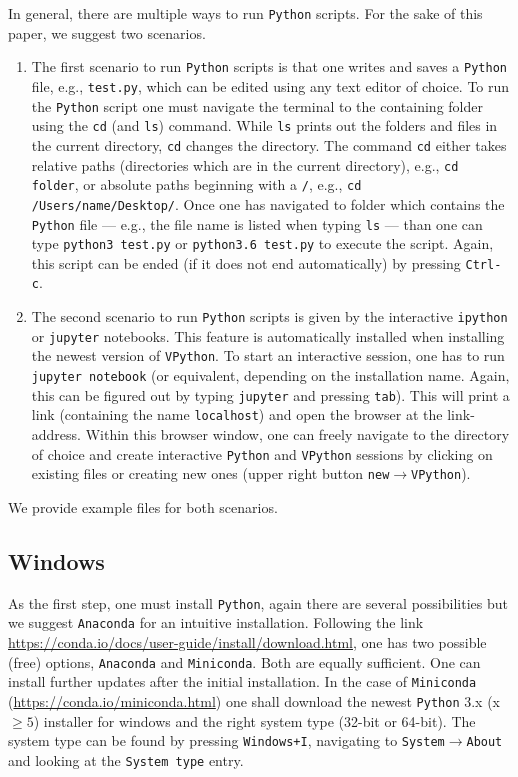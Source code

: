 \documentclass[12pt,ngerman,american]{iopart}
\newcommand{\python}[0]{\texttt{Python}}
\newcommand{\vpython}[0]{\texttt{VPython}}
\newcommand{\code}[1]{{\scriptsize\colorbox{light-gray}{\texttt{#1}}}}
\begin{document}
In general, there are multiple ways to run \python{} scripts.
For the sake of this paper, we suggest two scenarios.
\begin{enumerate}
\item The first scenario to run \python{} scripts is that one writes and saves a \python{} file, e.g., \texttt{test.py}, which can be edited using any text editor of choice.
	To run the \python{} script one must navigate the terminal to the containing folder using the \code{cd} (and \code{ls}) command.
	While \code{ls} prints out the folders and files in the current directory, \code{cd} changes the directory.
	The command \code{cd} either takes relative paths (directories which are in the current directory), e.g., \code{cd folder}, or absolute paths beginning with a \code{/}, e.g., \code{cd /Users/name/Desktop/}.
	Once one has navigated to folder which contains the \python{} file --- e.g., the file name is listed when typing \code{ls} --- than one can type \code{python3 test.py} or \code{python3.6 test.py} to execute the script.
	Again, this script can be ended (if it does not end automatically) by pressing \texttt{Ctrl-c}.
\item The second scenario to run \python{} scripts is given by the interactive \texttt{ipython} or \texttt{jupyter} notebooks.
	This feature is automatically installed when installing the newest version of \vpython{}.
	To start an interactive session, one has to run \code{jupyter notebook} (or equivalent, depending on the installation name. Again, this can be figured out by typing \code{jupyter} and pressing \texttt{tab}).
	This will print a link (containing the name \texttt{localhost}) and open the browser at the link-address.
	Within this browser window, one can freely navigate to the directory of choice and create interactive \python{} and \vpython{} sessions by clicking on existing files or creating new ones (upper right button \texttt{new}$\rightarrow$\vpython{}).
\end{enumerate}
We provide example files for both scenarios.

\subsection{Windows}\label{appendix:python-windows}

As the first step, one must install \python{}, again there are several possibilities but we suggest \texttt{Anaconda} for an intuitive installation.
Following the link \url{https://conda.io/docs/user-guide/install/download.html}, one has two possible (free) options, \texttt{Anaconda} and \texttt{Miniconda}.
Both are equally sufficient.
One can install further updates after the initial installation.
In the case of \texttt{Miniconda} (\url{https://conda.io/miniconda.html}) one shall download the newest \python{} 3.x (x $\geq5$) installer for windows and the right system type (32-bit or 64-bit).
The system type can be found by pressing \texttt{Windows+I}, navigating to \texttt{System}$\rightarrow$\texttt{About} and looking at the \texttt{System type} entry.
\end{document}

